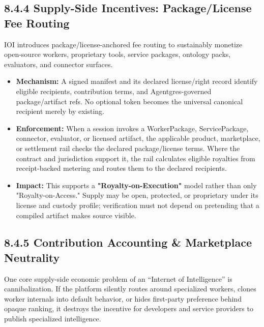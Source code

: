 \documentclass[
  11pt,
]{article}
\providecommand{\tightlist}{%
  \setlength{\itemsep}{0pt}\setlength{\parskip}{0pt}}
\begin{document}
\hypertarget{supply-side-incentives-package-license-fee-routing}{%
\subsection{8.4.4 Supply-Side Incentives: Package/License Fee
Routing}\label{supply-side-incentives-package-license-fee-routing}}

IOI introduces package/license-anchored fee routing to sustainably
monetize open-source workers, proprietary tools, service packages,
ontology packs, evaluators, and connector surfaces.

\begin{itemize}
\tightlist
\item
  \textbf{Mechanism:} A signed manifest and its declared license/right record
  identify eligible recipients, contribution terms, and
  Agentgres-governed package/artifact refs. No optional token becomes the
  universal canonical recipient merely by existing.
\item
  \textbf{Enforcement:} When a session invokes a WorkerPackage,
  ServicePackage, connector, evaluator, or licensed artifact, the
  applicable product, marketplace, or settlement rail checks the declared
  package/license terms. Where the contract and jurisdiction support it, the
  rail calculates eligible royalties from receipt-backed metering and routes
  them to the declared recipients.
\item
  \textbf{Impact:} This supports a \textbf{"Royalty-on-Execution"} model
  rather than only "Royalty-on-Access." Supply may be open, protected, or
  proprietary under its license and custody profile; verification must not
  depend on pretending that a compiled artifact makes source visible.
\end{itemize}

\hypertarget{contribution-accounting-marketplace-neutrality}{%
\subsection{8.4.5 Contribution Accounting \& Marketplace
Neutrality}\label{contribution-accounting-marketplace-neutrality}}

One core supply-side economic problem of an ``Internet of Intelligence'' is
cannibalization. If the platform silently routes around specialized
workers, clones worker internals into default behavior, or hides
first-party preference behind opaque ranking, it destroys the incentive
for developers and service providers to publish specialized
intelligence.
\end{document}
